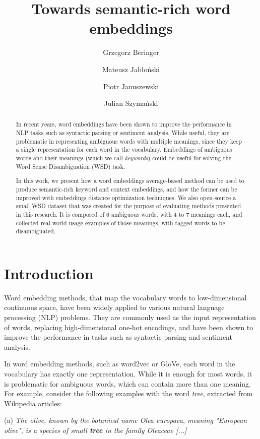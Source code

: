 \documentclass{llncs}
\title{Towards semantic-rich word embeddings}
\author{Grzegorz Beringer \and Mateusz Jabłoński \and Piotr Januszewski \and Julian Szymański}
\institute{
Faculty of Electronic Telecommunications and Informatics\\
Gda{\'n}sk University of Technology, Gda{\'n}sk, Poland
}
\begin{document}
\maketitle
\begin{abstract}

In recent years, word embeddings have been shown to improve the performance in NLP tasks such as syntactic parsing or sentiment analysis.
While useful, they are problematic in representing ambiguous words with multiple meanings, since they keep a single representation for each word in the vocabulary.
Embeddings of ambiguous words and their meanings (which we call \textit{keywords}) could be useful for solving the Word Sense Disambiguation (WSD) task.

In this work, we present how a word embeddings average-based method can be used to produce semantic-rich keyword and context embeddings, and how the former can be improved with embeddings distance optimization techniques.
We also open-source a small WSD dataset that was created for the purpose of evaluating methods presented in this research.
It is composed of 6 ambiguous words, with 4 to 7 meanings each, and collected real-world usage examples of those meanings, with tagged words to be disambiguated.

\end{abstract}

\section{Introduction}
\label{introduction}

Word embedding methods, that map the vocabulary words to low-dimensional continuous space, have been widely applied to various natural language processing (NLP) problems.
They are commonly used as the input representation of words, replacing high-dimensional one-hot encodings, and have been shown to improve the performance in tasks such as syntactic parsing\cite{parsingGrammars} and sentiment analysis\cite{sentimentAnalysis}.

In word embedding methods, such as word2vec\cite{word2vec} or GloVe\cite{GloVe}, each word in the vocabulary has exactly one representation.
While it is enough for most words, it is problematic for ambiguous words, which can contain more than one meaning.
For example, consider the following examples with the word \textit{tree}, extracted from Wikipedia articles:

\medskip
(a) \textit{The olive, known by the botanical name Olea europaea, meaning "European olive", is a species of small \textbf{tree} in the family Oleaceae [...]}
\end{document}
